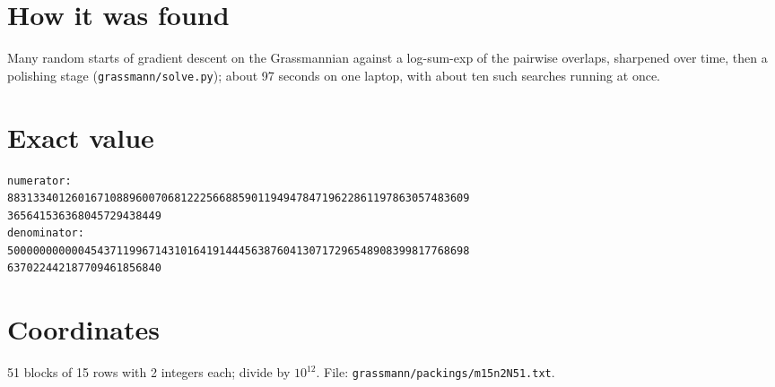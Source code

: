 \documentclass[11pt,a4paper]{article}
\begin{document}
\section{How it was found}
Many random starts of gradient descent on the Grassmannian against a log-sum-exp of the pairwise overlaps, sharpened over time, then a polishing stage (\texttt{grassmann/solve.py}); about 97 seconds on one laptop, with about ten such searches running at once.


\appendix
\section{Exact value}
{\small
\begin{verbatim}
numerator:
883133401260167108896007068122256688590119494784719622861197863057483609
365641536368045729438449
denominator:
500000000000454371199671431016419144456387604130717296548908399817768698
637022442187709461856840
\end{verbatim}}

\section{Coordinates}
51 blocks of 15 rows with 2 integers each; divide by $10^{12}$. File: \texttt{grassmann/packings/m15n2N51.txt}.
{\tiny
\begin{multicols}{4}
\end{multicols}}
\end{document}
